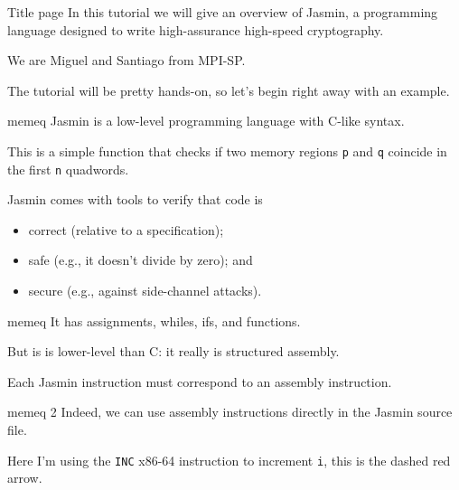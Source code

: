 \documentclass[
  xcolor={table,dvipsnames},
]{beamer}
\newcommand{\nextframe}{{\color{Red}{[NEXT FRAME]}}}
\begin{document}
\begin{frame}{Title page}
  In this tutorial we will give an overview of Jasmin, a programming language
  designed to write high-assurance high-speed cryptography.

  \vfill

  We are Miguel and Santiago from MPI-SP.

  \vfill

  The tutorial will be pretty hands-on, so let's begin right away with an
  example.

  \nextframe
\end{frame}

\begin{frame}{memeq}
  Jasmin is a low-level programming language with C-like syntax.

  \vfill

  This is a simple function that checks if two memory regions \texttt{p}
  and \texttt{q} coincide in the first \texttt{n} quadwords.

  \vfill

  Jasmin comes with tools to verify that code is
  \begin{itemize}
  \itemsep=1em
  \item[] correct (relative to a specification);
  \item[] safe (e.g., it doesn't divide by zero); and
  \item[] secure (e.g., against side-channel attacks).
  \end{itemize}
\end{frame}

\begin{frame}{memeq}
  It has assignments, whiles, ifs, and functions.

  \vfill

  But is is lower-level than C: it really is structured assembly.

  \vfill

  Each Jasmin instruction must correspond to an assembly instruction.

  \nextframe
\end{frame}

\begin{frame}{memeq 2}
  Indeed, we can use assembly instructions directly in the Jasmin source file.

  \nextframe

  \vfill

  Here I'm using the \texttt{INC} x86-64 instruction to increment \texttt{i},
  this is the dashed red arrow.
\end{frame}
\end{document}
